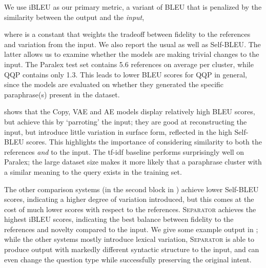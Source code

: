 \documentclass[11pt,a4paper]{article}
\begin{document}
We use iBLEU \cite{ibleu} as our primary metric, a variant of BLEU
\cite{papineni-etal-2002-bleu,post-2018-call} that is penalized by the
similarity between the output and the \textit{input}, 

where  is a constant that weights the tradeoff between
fidelity to the references and variation from the input. We also
report the usual  as well as
\mbox{Self-{BLEU}}. The latter allows us to examine
whether the models are making trivial changes to the input. The Paralex
test set contains 5.6 references on average per cluster, while QQP
contains only 1.3. This leads to lower BLEU scores for QQP in general,
since the models are evaluated on whether they generated the
specific paraphrase(s) present in the dataset.












 shows that the Copy, VAE and AE models display
relatively high BLEU scores, but achieve this by `parroting' the
input; they are good at reconstructing the input, but introduce little
variation in surface form, reflected in the high Self-BLEU
scores. This highlights the importance of considering similarity to
both the references \textit{and} to the input.  The \mbox{tf-idf}
baseline performs surprisingly well on Paralex; the large dataset size makes it more likely that a paraphrase cluster with a similar meaning to the query exists in the training set.  

The other comparison
systems (in the second block in ) achieve lower Self-BLEU
scores, indicating a higher degree of variation introduced, but this
comes at the cost of much lower scores with respect to the
references. \textsc{Separator} achieves the highest iBLEU scores,
indicating the best balance between fidelity to the references and
novelty compared to the input. We give some example output in
; while the other systems mostly introduce lexical
variation, \textsc{Separator} is able to produce output with markedly different syntactic structure to the input, and can even
change the question type while successfully preserving the original intent.
\end{document}
